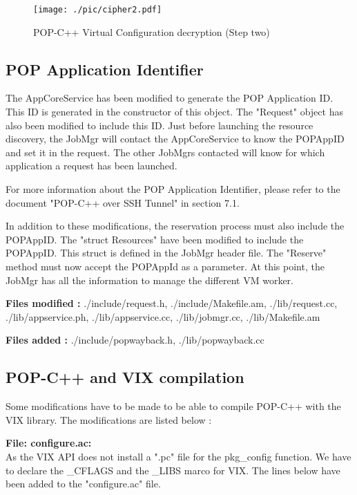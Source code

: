 \begin{figure}[ht]
	\caption{POP-C++ Virtual Configuration decryption (Step two)}
  	\centering
	\texttt{[image: ./pic/cipher2.pdf]}
	\label{fig:cipher2}
\end{figure}

%
%
\subsection{POP Application Identifier}
The AppCoreService has been modified to generate the POP Application ID. This ID is generated in the constructor of this object. The "Request" object has also been modified to include this ID. Just before launching the resource discovery, the JobMgr will contact the AppCoreService to know the POPAppID and set it in the request. The other JobMgrs contacted will know for which application a request has been launched. \s

For more information about the POP Application Identifier, please refer to the document "POP-C++ over SSH Tunnel"\cite{popcssh} in section 7.1.\s

In addition to these modifications, the reservation process must also include the POPAppID. The "struct Resources" have been modified to include the POPAppID. This struct is defined in the JobMgr header file. The "Reserve" method must now accept the POPAppId as a parameter. At this point, the JobMgr has all the information to manage the different VM worker.\s

\textbf{Files modified : } ./include/request.h, ./include/Makefile.am, ./lib/request.cc, ./lib/appservice.ph, ./lib/appservice.cc, ./lib/jobmgr.cc, ./lib/Makefile.am\s

\textbf{Files added : } ./include/popwayback.h, ./lib/popwayback.cc

%
%
\subsection{POP-C++ and VIX compilation}
Some modifications have to be made to be able to compile POP-C++ with the VIX library. The modifications are listed below : \s

\textbf{File: configure.ac:}\\
As the VIX API does not install a ".pc" file for the pkg\_config function. We have to declare the \_CFLAGS and the \_LIBS marco for VIX. The lines below have been added to the "configure.ac" file. \s

